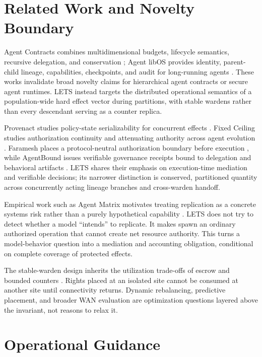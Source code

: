 \documentclass[10pt]{article}
\newcommand{\LETS}{\textsc{LETS}}
\begin{document}
\section{Related Work and Novelty Boundary}

Agent Contracts combines multidimensional budgets, lifecycle semantics, recursive delegation, and
conservation \citep{ye2026agentcontracts}; Agent libOS provides identity, parent-child lineage,
capabilities, checkpoints, and audit for long-running agents \citep{zhang2026agentlibos}. These
works invalidate broad novelty claims for hierarchical agent contracts or secure agent runtimes.
\LETS{} instead targets the distributed operational semantics of a population-wide hard effect
vector during partitions, with stable wardens rather than every descendant serving as a counter
replica.

Provenact studies policy-state serializability for concurrent effects \citep{peng2026provenact}.
Fixed Ceiling studies authorization continuity and attenuating authority across agent evolution
\citep{zhang2026fixedceiling}. Faramesh places a protocol-neutral authorization boundary before
execution \citep{fatmi2026faramesh}, while AgentBound issues verifiable governance receipts bound
to delegation and behavioral artifacts \citep{kaul2026agentbound}. \LETS{} shares their emphasis
on execution-time mediation and verifiable decisions; its narrower distinction is conserved,
partitioned quantity across concurrently acting lineage branches and cross-warden handoff.

Empirical work such as Agent Matrix motivates treating replication as a concrete systems risk
rather than a purely hypothetical capability \citep{zhang2025agentmatrix}. \LETS{} does not try to
detect whether a model ``intends'' to replicate. It makes spawn an ordinary authorized operation
that cannot create net resource authority. This turns a model-behavior question into a mediation
and accounting obligation, conditional on complete coverage of protected effects.

The stable-warden design inherits the utilization trade-offs of escrow and bounded counters
\citep{oneil1986escrow,balegas2015bounded}. Rights placed at an isolated site cannot be consumed at
another site until connectivity returns. Dynamic rebalancing, predictive placement, and broader
WAN evaluation are optimization questions layered above the invariant, not reasons to relax it.

\section{Operational Guidance}
\end{document}

